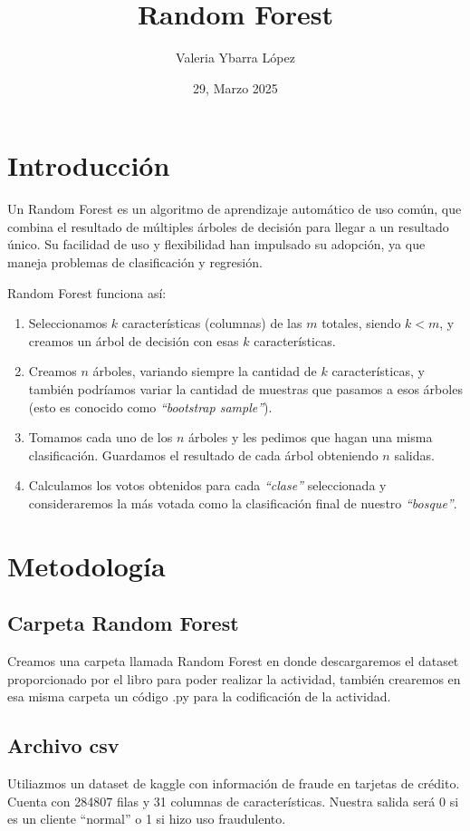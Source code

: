 \documentclass{article}
\title{Random Forest}
\author{Valeria Ybarra López}
\date{29, Marzo 2025}
\begin{document}
\maketitle

\section{Introducción}
Un Random Forest  es un algoritmo de aprendizaje automático de uso común, que combina el resultado de múltiples árboles de decisión para llegar a un resultado único. Su facilidad de uso y flexibilidad han impulsado su adopción, ya que maneja problemas de clasificación y regresión.



Random Forest funciona así:

\begin{enumerate}
    \item Seleccionamos $k$ características (columnas) de las $m$ totales, siendo $k < m$, y creamos un árbol de decisión con esas $k$ características.
    \item Creamos $n$ árboles, variando siempre la cantidad de $k$ características, y también podríamos variar la cantidad de muestras que pasamos a esos árboles (esto es conocido como \textit{``bootstrap sample''}).
    \item Tomamos cada uno de los $n$ árboles y les pedimos que hagan una misma clasificación. Guardamos el resultado de cada árbol obteniendo $n$ salidas.
    \item Calculamos los votos obtenidos para cada \textit{``clase''} seleccionada y consideraremos la más votada como la clasificación final de nuestro \textit{``bosque''}.
\end{enumerate}

\section{Metodología}

\subsection{Carpeta Random Forest}
Creamos una carpeta llamada Random Forest en donde descargaremos el dataset proporcionado por el libro para poder realizar la actividad, también crearemos en esa misma carpeta un código .py para la codificación de la actividad.



\subsection{Archivo csv}
Utiliazmos un dataset de kaggle con información de fraude  en tarjetas de crédito. Cuenta con 284807 filas y 31 columnas de características. Nuestra salida será 0 si es un cliente “normal” o 1 si hizo uso fraudulento.
\end{document}
